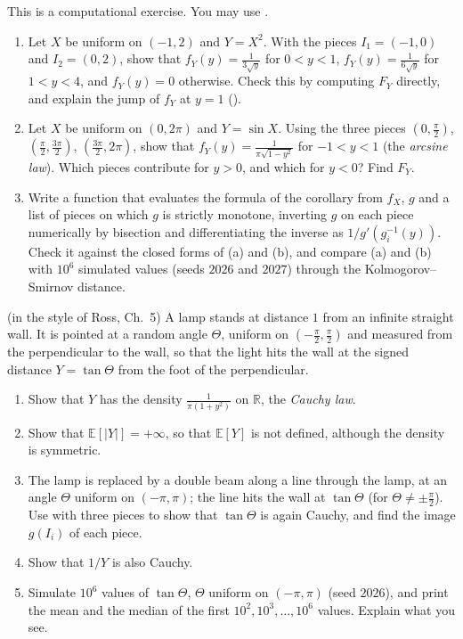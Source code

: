 \begin{exercise}\label{ex:tr-piecewise}
\medium This is a computational exercise. You may use .
\begin{enumerate}[label=(\alph*)]
  \item Let $X$ be uniform on $(-1,2)$ and $Y=X^2$. With the pieces $I_1=(-1,0)$ and $I_2=(0,2)$,
    show that $f_Y(y)=\frac1{3\sqrt y}$ for $0<y<1$, $f_Y(y)=\frac1{6\sqrt y}$ for $1<y<4$, and
    $f_Y(y)=0$ otherwise. Check this by computing $F_Y$ directly, and explain the jump of $f_Y$ at
    $y=1$ ().
  \item Let $X$ be uniform on $(0,2\pi)$ and $Y=\sin X$. Using the three pieces
    $(0,\frac\pi2)$, $(\frac\pi2,\frac{3\pi}2)$, $(\frac{3\pi}2,2\pi)$, show that
    $f_Y(y)=\frac1{\pi\sqrt{1-y^2}}$ for $-1<y<1$ (the \emph{arcsine law}). Which pieces contribute
    for $y>0$, and which for $y<0$? Find $F_Y$.
  \item Write a function that evaluates the formula of the corollary from $f_X$, $g$ and a list of
    pieces on which $g$ is strictly monotone, inverting $g$ on each piece numerically by bisection
    and differentiating the inverse as $1/g'(g_i^{-1}(y))$. Check it against the closed forms of (a)
    and (b), and compare (a) and (b) with $10^6$ simulated values (seeds $2026$ and $2027$) through
    the Kolmogorov--Smirnov distance.
\end{enumerate}
\end{exercise}

\begin{exercise}\label{ex:tr-cauchy}
\medium (in the style of Ross, Ch.~5) A lamp stands at distance $1$ from an infinite straight wall.
It is pointed at a random angle $\Theta$, uniform on $(-\frac\pi2,\frac\pi2)$ and measured from the
perpendicular to the wall, so that the light hits the wall at the signed distance $Y=\tan\Theta$
from the foot of the perpendicular.
\begin{enumerate}[label=(\alph*)]
  \item Show that $Y$ has the density $\frac1{\pi(1+y^2)}$ on $\mathbb R$, the \emph{Cauchy law}.
  \item Show that $\mathbb E[|Y|]=+\infty$, so that $\mathbb E[Y]$ is not defined, although the
    density is symmetric.
  \item The lamp is replaced by a double beam along a line through the lamp, at an angle $\Theta$
    uniform on $(-\pi,\pi)$; the line hits the wall at $\tan\Theta$ (for $\Theta\ne\pm\frac\pi2$).
    Use  with three pieces to show that $\tan\Theta$ is again Cauchy, and
    find the image $g(I_i)$ of each piece.
  \item Show that $1/Y$ is also Cauchy.
  \item Simulate $10^6$ values of $\tan\Theta$, $\Theta$ uniform on $(-\pi,\pi)$ (seed $2026$),
    and print the mean and the median of the first $10^2,10^3,\dots,10^6$ values. Explain what you see.
\end{enumerate}
\end{exercise}

